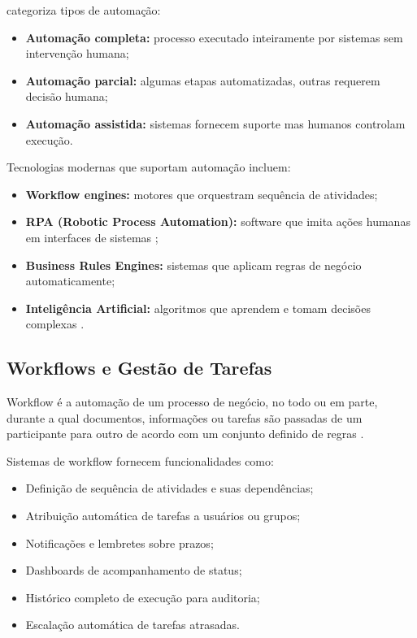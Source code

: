 \cite{vanderaalst2003} categoriza tipos de automação:

\begin{itemize}
    \item \textbf{Automação completa:} processo executado inteiramente por sistemas sem intervenção humana;
    \item \textbf{Automação parcial:} algumas etapas automatizadas, outras requerem decisão humana;
    \item \textbf{Automação assistida:} sistemas fornecem suporte mas humanos controlam execução.
\end{itemize}

Tecnologias modernas que suportam automação incluem:

\begin{itemize}
    \item \textbf{Workflow engines:} motores que orquestram sequência de atividades;
    \item \textbf{RPA (Robotic Process Automation):} software que imita ações humanas em interfaces de sistemas \cite{lacity2016};
    \item \textbf{Business Rules Engines:} sistemas que aplicam regras de negócio automaticamente;
    \item \textbf{Inteligência Artificial:} algoritmos que aprendem e tomam decisões complexas \cite{russell2020}.
\end{itemize}

\subsection{Workflows e Gestão de Tarefas}

Workflow é a automação de um processo de negócio, no todo ou em parte, durante a qual documentos, informações ou tarefas são passadas de um participante para outro de acordo com um conjunto definido de regras \cite{georgakopoulos1995}.

Sistemas de workflow fornecem funcionalidades como:

\begin{itemize}
    \item Definição de sequência de atividades e suas dependências;
    \item Atribuição automática de tarefas a usuários ou grupos;
    \item Notificações e lembretes sobre prazos;
    \item Dashboards de acompanhamento de status;
    \item Histórico completo de execução para auditoria;
    \item Escalação automática de tarefas atrasadas.
\end{itemize}

